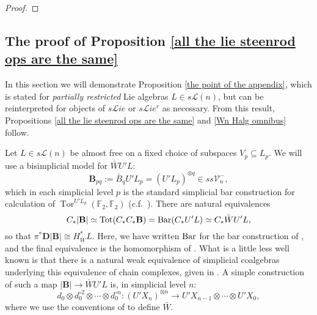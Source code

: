 \documentclass[11pt]{amsart} \renewcommand{\baselinestretch}{1.2}
\theoremstyle{plain}
\numberwithin{equation}{section} %
\theoremstyle{plain}
\numberwithin{equation}{chapter} %
\DeclareMathOperator{\Tor}{Tor}
\renewcommand{\to}{\longrightarrow}
\newcommand{\scrL}{\mathscr{L}}
\newcommand{\calL}{\mathcal{L}}
\newcommand{\calV}{\mathcal{V}}
\newcommand{\call}{\mathcal{L}}
\newcommand{\citeBOX}[2][]{\cite[\mbox{#1}]{#2}}
\newcommand{\vect}[2]{\calV^{#1}_{#2}}
\newcommand{\UEA}{U'}%
\newcommand{\F}{\mathbb{F}}
\newcommand{\liealgs}{{\scrL\!\textit{ie}}}
\newcommand{\restliealgs}{{\scrL\!\textit{ie}^\textit{r}}}
\newcommand{\Ftwo}{\F_2}
\newcommand{\diag}[1]{|#1|}
\newcommand{\dual}{\mathbf{D}}
\newcommand{\SubsectionOrSection}[1]{\subsection{#1}}
\begin{document}
\begin{appendices}
\begin{proof}
\end{proof}


\SubsectionOrSection{The proof of Proposition \ref{all the lie steenrod ops are the same}}
In this section we will demonstrate Proposition \ref{the point of the appendix}, which is stated for \emph{partially restricted} Lie algebras $L\in s\call(n)$, but can be reinterpreted for objects of $s\liealgs$ or $s\restliealgs$ as necessary. From this result,  Propositions \ref{all the lie steenrod ops are the same} and \ref{Wn Halg omnibus} follow.


Let $ L\in s\calL(n)$ be almost free on a fixed choice of subspaces $V_p\subseteq  L_p$.
We will use a bisimplicial model for $\bar{W}\UEA L$:
\[\textbf{B}_{pq}:=\bar{B}_q \UEA L_p=(\UEA L_p)^{\otimes q}\in ss\vect{-}{n},\]
which in each simplicial level $p$ is the standard simplicial bar construction  for calculation of $\Tor^{\UEA L_p}(\Ftwo ,\Ftwo )$ (c.f.\ \citeBOX[\S1]{PriddyKoszul.pdf}). There are natural equivalences
\[C_*\diag{\textbf{B}}\simeq \textup{Tot}(C_*C_*\textbf{B})=\textup{Bar}(C_*\UEA L)\simeq C_* \bar{W}\UEA L,\]
so that $\pi^*\dual\diag{\mathbf{B}}\cong H^*_{\bar{W}}L$.
Here, we have written $\textup{Bar}$ for the bar construction of \citeBOX[\S7]{grpsHPin.pdf}, and the final equivalence is the homomorphism of \cite[Theorem 20.1]{grpsHPin.pdf}. What is a little less well known is that there is a natural weak equivalence of simplicial coalgebras underlying this equivalence of chain complexes, given in \cite[Theorem 1.1]{CarrRemed.pdf}. A simple construction of such a map 
$\diag{\textbf{B}}\to \bar{W}\UEA L$ is, in simplicial level $n$:
\[d_0\otimes d_0^{\circ2}\otimes\cdots \otimes d_0^{\circ n}:(\UEA X_n)^{\otimes n}\to \UEA X_{n-1}\otimes\cdots \otimes \UEA X_0,\]
where we use the conventions of \citeBOX[\S5]{MillerSullivanConjecture.pdf} to define $\bar{W}$.




\end{appendices}
\end{document}
